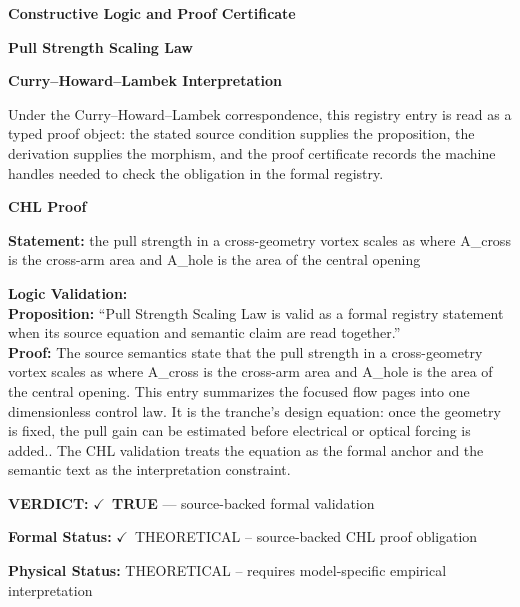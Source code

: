 \clearpage
\begingroup\tzpsupportsetup
\noindent\textbf{\fontsize{10.8pt}{12.8pt}\selectfont [ID 0124] Constructive Logic and Proof Certificate}\par
\noindent\textbf{\fontsize{10pt}{12pt}\selectfont Pull Strength Scaling Law}\par
\vspace{0.45em}
\begingroup
\footnotesize
\setlength{\parskip}{0.22em}
\setlength{\parindent}{0pt}
\noindent\textbf{Curry--Howard--Lambek Interpretation}\par
Under the Curry--Howard--Lambek correspondence, this registry entry is read as a typed proof
object: the stated source condition supplies the proposition, the derivation supplies the
morphism, and the proof certificate records the machine handles needed to check the obligation
in the formal registry.

\vspace{0.45em}
\noindent\textbf{CHL Proof}\par
\textbf{Statement:} the pull strength in a cross-geometry vortex scales as where A\_cross is the cross-arm
area and A\_hole is the area of the central opening

\textbf{Logic Validation:}\\
\textbf{Proposition:} ``Pull Strength Scaling Law is valid as a formal registry statement when its source
equation and semantic claim are read together.''\\
\textbf{Proof:} The source semantics state that the pull strength in a cross-geometry vortex scales as
where A\_cross is the cross-arm area and A\_hole is the area of the central opening.
This entry summarizes the focused flow pages into one dimensionless control law. It is
the tranche's design equation: once the geometry is fixed, the pull gain can be
estimated before electrical or optical forcing is added.. The CHL validation treats the
equation as the formal anchor and the semantic text as the interpretation constraint.

\textbf{VERDICT:} \ensuremath{\checkmark}\ \textbf{TRUE} --- source-backed formal validation

\textbf{Formal Status:} \ensuremath{\checkmark}\ THEORETICAL -- source-backed CHL proof obligation

\textbf{Physical Status:} THEORETICAL -- requires model-specific empirical interpretation
\par\vspace{0.45em}
\par
\ifTZPDarkEdition
{}
\fi
\endgroup
\endgroup
